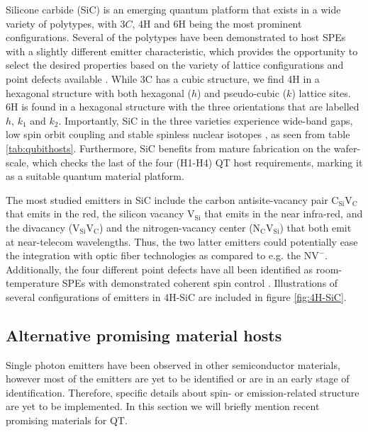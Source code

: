 Silicone carbide (SiC) is an emerging quantum platform that exists in a wide variety of polytypes, with $3C$, 4H and 6H being the most prominent configurations. Several of the polytypes have been demonstrated to host SPEs  with a slightly different emitter characteristic, which provides the opportunity to select the desired properties based on the variety of lattice configurations and point defects available \cite{Weber2010, Son2020, Falk2013}. While 3C has a cubic structure, we find 4H in a hexagonal structure with both hexagonal ($h$) and pseudo-cubic ($k$) lattice sites. 6H is found in a hexagonal structure with the three orientations that are labelled $h$, $k_1$ and $k_2$. Importantly, SiC in the three varieties experience wide-band gaps, low spin orbit coupling and stable spinless nuclear isotopes \cite{Neudeck1995, Weber2010, Martienssen2005}, as seen from table \ref{tab:qubithosts}. Furthermore, SiC benefits from mature fabrication on the wafer-scale, which checks the last of the four (H1-H4) QT host requirements, marking it as a suitable quantum material platform.


The most studied emitters in SiC include the carbon antisite-vacancy pair $\text{C}_{\text{Si}}\text{V}_{\text{C}}$ that emits in the red, the silicon vacancy $\text{V}_{\text{Si}}$ that emits in the near infra-red, and the divacancy ($\text{V}_{\text{Si}}\text{V}_{\text{C}}$) and the nitrogen-vacancy center ($\text{N}_{\text{C}}\text{V}_{\text{Si}}$) that both emit at near-telecom wavelengths. Thus, the two latter emitters could potentially ease the integration with optic fiber technologies as compared to e.g. the $\text{NV}^{-}$. Additionally, the four different point defects have all been identified as room-temperature SPEs with demonstrated coherent spin control \cite{Widmann2014, }. Illustrations of several configurations of emitters in 4H-SiC are included in figure \ref{fig:4H-SiC}.

\subsection{Alternative promising material hosts}
\label{promising-material-hosts}

Single photon emitters have been observed in other semiconductor materials, however most of the emitters are yet to be identified or are in an early stage of identification. Therefore, specific details about spin- or emission-related structure are yet to be implemented. In this section we will briefly mention recent promising materials for QT.

